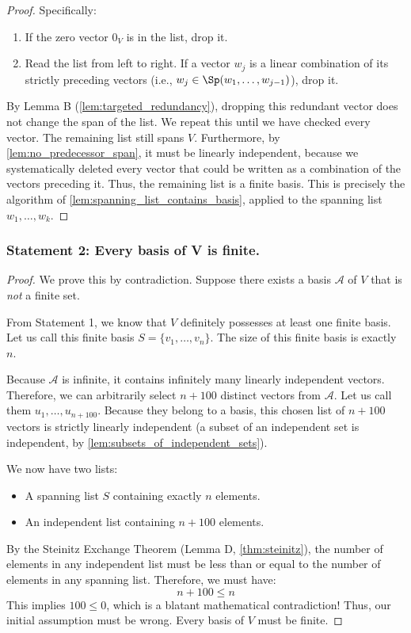 \begin{proof}
Specifically:
\begin{enumerate}
    \item If the zero vector $0_V$ is in the list, drop it.
    \item Read the list from left to right. If a vector $w_j$ is a linear combination of its strictly preceding vectors (i.e., $w_j \in \Sp(w_1, \dots, w_{j-1})$), drop it.
\end{enumerate}
By Lemma B (\cref{lem:targeted_redundancy}), dropping this redundant vector does not change the span of the list. We repeat this until we have checked every vector. The remaining list still spans $V$. Furthermore, by \cref{lem:no_predecessor_span}, it must be linearly independent, because we systematically deleted every vector that could be written as a combination of the vectors preceding it. Thus, the remaining list is a finite basis. This is precisely the algorithm of \cref{lem:spanning_list_contains_basis}, applied to the spanning list $w_1, \dots, w_k$.
\end{proof}

\subsubsection*{Statement 2: Every basis of V is finite.}

\begin{proof}
We prove this by contradiction. Suppose there exists a basis $\mathcal{A}$ of $V$ that is \textit{not} a finite set. 

From Statement 1, we know that $V$ definitely possesses at least one finite basis. Let us call this finite basis $S = \{v_1, \dots, v_n\}$. The size of this finite basis is exactly $n$.

Because $\mathcal{A}$ is infinite, it contains infinitely many linearly independent vectors. Therefore, we can arbitrarily select $n + 100$ distinct vectors from $\mathcal{A}$. Let us call them $u_1, \dots, u_{n+100}$.
Because they belong to a basis, this chosen list of $n+100$ vectors is strictly linearly independent (a subset of an independent set is independent, by \cref{lem:subsets_of_independent_sets}).

We now have two lists:
\begin{itemize}
    \item A spanning list $S$ containing exactly $n$ elements.
    \item An independent list containing $n+100$ elements.
\end{itemize}

By the Steinitz Exchange Theorem (Lemma D, \cref{thm:steinitz}), the number of elements in any independent list must be less than or equal to the number of elements in any spanning list. Therefore, we must have:
\[
n + 100 \le n
\]
This implies $100 \le 0$, which is a blatant mathematical contradiction! Thus, our initial assumption must be wrong. Every basis of $V$ must be finite.
\end{proof}

